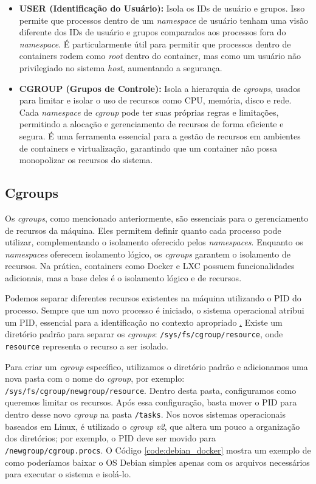 \begin{itemize}
  \item \textbf{USER (Identificação do Usuário):} Isola os IDs de usuário e grupos. Isso permite que processos dentro de um \textit{namespace} de usuário tenham uma visão diferente dos IDs de usuário e grupos comparados aos processos fora do \textit{namespace}. É particularmente útil para permitir que processos dentro de containers rodem como \textit{root} dentro do container, mas como um usuário não privilegiado no sistema \textit{host}, aumentando a segurança.
  
  \item \textbf{CGROUP (Grupos de Controle):} Isola a hierarquia de \textit{cgroups}, usados para limitar e isolar o uso de recursos como CPU, memória, disco e rede. Cada \textit{namespace} de \textit{cgroup} pode ter suas próprias regras e limitações, permitindo a alocação e gerenciamento de recursos de forma eficiente e segura. É uma ferramenta essencial para a gestão de recursos em ambientes de containers e virtualização, garantindo que um container não possa monopolizar os recursos do sistema.
\end{itemize}

\subsection{Cgroups}

Os \textit{cgroups}, como mencionado anteriormente, são essenciais para o gerenciamento de recursos da máquina. Eles permitem definir quanto cada processo pode utilizar, complementando o isolamento oferecido pelos \textit{namespaces}. Enquanto os \textit{namespaces} oferecem isolamento lógico, os \textit{cgroups} garantem o isolamento de recursos. Na prática, containers como Docker e LXC possuem funcionalidades adicionais, mas a base deles é o isolamento lógico e de recursos.

Podemos separar diferentes recursos existentes na máquina utilizando o PID do processo. Sempre que um novo processo é iniciado, o sistema operacional atribui um PID, essencial para a identificação no contexto apropriado \href{https://docs.kernel.org/admin-guide/cgroup-v1/cgroups.html}. Existe um diretório padrão para separar os \textit{cgroups}: \texttt{/sys/fs/cgroup/resource}, onde \texttt{resource} representa o recurso a ser isolado.

Para criar um \textit{cgroup} específico, utilizamos o diretório padrão e adicionamos uma nova pasta com o nome do \textit{cgroup}, por exemplo: \texttt{/sys/fs/cgroup/newgroup/resource}. Dentro desta pasta, configuramos como queremos limitar os recursos. Após essa configuração, basta mover o PID para dentro desse novo \textit{cgroup} na pasta \texttt{/tasks}. Nos novos sistemas operacionais baseados em Linux, é utilizado o \textit{cgroup v2}, que altera um pouco a organização dos diretórios; por exemplo, o PID deve ser movido para \texttt{/newgroup/cgroup.procs}. O Código \ref{code:debian_docker} mostra um exemplo de como poderíamos baixar o OS Debian simples apenas com os arquivos necessários para executar o sistema e isolá-lo.


